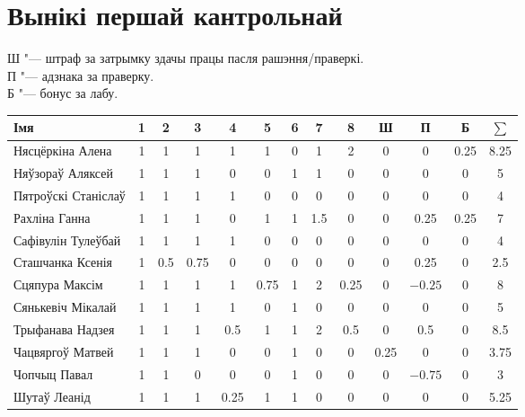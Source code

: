 \documentclass[12pt, a4paper]{extarticle}
\begin{document}
    \section{Вынікі першай кантрольнай}
    \noindent Ш "--- штраф за затрымку здачы працы пасля рашэння/праверкі. \\
    П "--- адзнака за праверку. \\
    Б "--- бонус за лабу.
    \begin{table}[H]
        \begin{tabular}{|l|c|c|c|c|c|c|c|c|c|c|c|c|}
            \hline
            Імя                 & 1 &  2  &  3   &  4   &  5   & 6 &  7  &  8   &  Ш   &    П    &  Б   & $\sum$ \\ \hline
            Нясцёркіна Алена    & 1 &  1  &  1   &  1   &  1   & 0 &  1  &  2   &  0   &    0    & 0.25 &  8.25  \\ \hline
            Няўзораў Аляксей    & 1 &  1  &  1   &  0   &  0   & 1 &  1  &  0   &  0   &    0    &  0   &   5    \\ \hline
            Пятроўскі Станіслаў & 1 &  1  &  1   &  1   &  0   & 0 &  0  &  0   &  0   &    0    &  0   &   4    \\ \hline
            Рахліна Ганна       & 1 &  1  &  1   &  0   &  1   & 1 & 1.5 &  0   &  0   &   0.25  & 0.25 &   7    \\ \hline
            Сафівулін Тулеўбай  & 1 &  1  &  1   &  1   &  0   & 0 &  0  &  0   &  0   &    0    &  0   &   4    \\ \hline
            Сташчанка Ксенія    & 1 & 0.5 & 0.75 &  0   &  0   & 0 &  0  &  0   &  0   &   0.25  &  0   &   2.5  \\ \hline
            Сцяпура Максім      & 1 &  1  &  1   &  1   & 0.75 & 1 &  2  & 0.25 &  0   & $-0.25$ &  0   &   8    \\ \hline
            Сянькевіч Мікалай   & 1 &  1  &  1   &  1   &  0   & 1 &  0  &  0   &  0   &    0    &  0   &   5    \\ \hline
            Трыфанава Надзея    & 1 &  1  &  1   &  0.5 &  1   & 1 &  2  &  0.5 &  0   &   0.5   &  0   &   8.5  \\ \hline
            Чацвяргоў Матвей    & 1 &  1  &  1   &  0   &  0   & 1 &  0  &  0   & 0.25 &    0    &  0   &  3.75  \\ \hline
            Чопчыц Павал        & 1 &  1  &  0   &  0   &  0   & 1 &  0  &  0   &  0   & $-0.75$ &  0   &   3    \\ \hline
            Шутаў Леанід        & 1 &  1  &  1   & 0.25 &  1   & 1 &  0  &  0   &  0   &    0    &  0   &  5.25  \\ \hline
        \end{tabular}
    \end{table}
\end{document}
